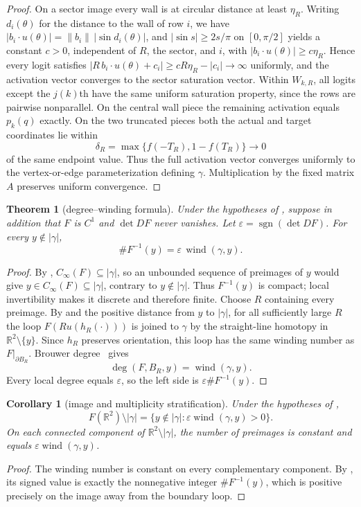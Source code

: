\documentclass[11pt,twoside,leqno]{article}
\theoremstyle{plain}
\newtheorem{theorem}{Theorem}[section]
\newtheorem{corollary}[corollary]{Corollary}
\theoremstyle{definition}
\theoremstyle{remark}
\newcommand{\R}{\mathbb{R}}
\newcommand{\sgn}{\operatorname{sgn}}
\newcommand{\norm}[1]{\lVert #1 \rVert}
\newcommand{\clinf}{C_{\infty}}
\newcommand{\wind}{\operatorname{wind}}
\begin{document}
\begin{proof}
On a sector image every wall is at circular distance at least $\eta_R$.  Writing $d_i(\theta)$ for the distance to the wall of row $i$, we have $\lvert b_i\cdot u(\theta)\rvert=\norm{b_i}\,\lvert\sin d_i(\theta)\rvert$, and $\lvert\sin s\rvert\ge 2s/\pi$ on $[0,\pi/2]$ yields a constant $c>0$, independent of $R$, the sector, and $i$, with $\lvert b_i\cdot u(\theta)\rvert\ge c\eta_R$.  Hence every logit satisfies $\lvert R\,b_i\cdot u(\theta)+c_i\rvert\ge cR\eta_R-\lvert c_i\rvert\to\infty$ uniformly, and the activation vector converges to the sector saturation vector. Within $W_{k,R}$, all logits except the $j(k)$th have the same uniform saturation property, since the rows are pairwise nonparallel. On the central wall piece the remaining activation equals $p_k(q)$ exactly.  On the two truncated pieces both the actual and target coordinates lie within
\[
 \delta_R=\max\{f(-T_R),1-f(T_R)\}\longrightarrow0
\]
of the same endpoint value.  Thus the full activation vector converges uniformly to the vertex-or-edge parameterization defining $\gamma$.  Multiplication by the fixed matrix $A$ preserves uniform convergence.
\end{proof}

\begin{theorem}[degree--winding formula]\label{thm:winding}
Under the hypotheses of , suppose in addition that $F$ is $C^1$ and $\det DF$ never vanishes.  Let $\varepsilon=\sgn(\det DF)$.  For every $y\notin|\gamma|$,
\[
 \#F^{-1}(y)=\varepsilon\,\wind(\gamma,y).
\]
\end{theorem}
\begin{proof}
By , $\clinf(F)\subseteq|\gamma|$, so an unbounded sequence of preimages of $y$ would give $y\in\clinf(F)\subseteq|\gamma|$, contrary to $y\notin|\gamma|$.  Thus $F^{-1}(y)$ is compact; local invertibility makes it discrete and therefore finite.  Choose $R$ containing every preimage.  By  and the positive distance from $y$ to $|\gamma|$, for all sufficiently large $R$ the loop $F(Ru(h_R(\cdot)))$ is joined to $\gamma$ by the straight-line homotopy in $\R^2\setminus\{y\}$.  Since $h_R$ preserves orientation, this loop has the same winding number as $F|_{\partial B_R}$. Brouwer degree~\cite{outerelo-ruiz} gives
\[
 \deg(F,B_R,y)=\wind(\gamma,y).
\]
Every local degree equals $\varepsilon$, so the left side is $\varepsilon\#F^{-1}(y)$.
\end{proof}

\begin{corollary}[image and multiplicity stratification]\label{cor:image-strata}
Under the hypotheses of ,
\[
 F(\R^2)\setminus|\gamma|
 =\{y\notin|\gamma|:\varepsilon\wind(\gamma,y)>0\}.
\]
On each connected component of $\R^2\setminus|\gamma|$, the number of preimages is constant and equals $\varepsilon\wind(\gamma,y)$.
\end{corollary}
\begin{proof}
The winding number is constant on every complementary component.  By , its signed value is exactly the nonnegative integer $\#F^{-1}(y)$, which is positive precisely on the image away from the boundary loop.
\end{proof}
\end{document}
